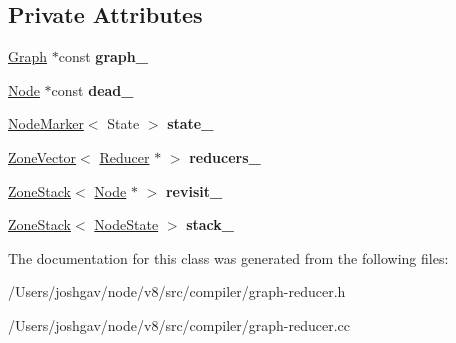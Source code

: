 \subsection*{Private Attributes}
\begin{DoxyCompactItemize}
\item 
\hyperlink{classv8_1_1internal_1_1compiler_1_1_graph}{Graph} $\ast$const {\bfseries graph\+\_\+}\hypertarget{classv8_1_1internal_1_1compiler_1_1_graph_reducer_ac9ecede3112133b13dd3836e921aeac7}{}\label{classv8_1_1internal_1_1compiler_1_1_graph_reducer_ac9ecede3112133b13dd3836e921aeac7}

\item 
\hyperlink{classv8_1_1internal_1_1compiler_1_1_node}{Node} $\ast$const {\bfseries dead\+\_\+}\hypertarget{classv8_1_1internal_1_1compiler_1_1_graph_reducer_adb5f30dc16f540d01186c7237545e3b9}{}\label{classv8_1_1internal_1_1compiler_1_1_graph_reducer_adb5f30dc16f540d01186c7237545e3b9}

\item 
\hyperlink{classv8_1_1internal_1_1compiler_1_1_node_marker}{Node\+Marker}$<$ State $>$ {\bfseries state\+\_\+}\hypertarget{classv8_1_1internal_1_1compiler_1_1_graph_reducer_a8a92d00b6c73dc841258d04214c852e3}{}\label{classv8_1_1internal_1_1compiler_1_1_graph_reducer_a8a92d00b6c73dc841258d04214c852e3}

\item 
\hyperlink{classv8_1_1internal_1_1_zone_vector}{Zone\+Vector}$<$ \hyperlink{classv8_1_1internal_1_1compiler_1_1_reducer}{Reducer} $\ast$ $>$ {\bfseries reducers\+\_\+}\hypertarget{classv8_1_1internal_1_1compiler_1_1_graph_reducer_abbe8e5ae035cdc4b1be9d53b89bebe17}{}\label{classv8_1_1internal_1_1compiler_1_1_graph_reducer_abbe8e5ae035cdc4b1be9d53b89bebe17}

\item 
\hyperlink{classv8_1_1internal_1_1_zone_stack}{Zone\+Stack}$<$ \hyperlink{classv8_1_1internal_1_1compiler_1_1_node}{Node} $\ast$ $>$ {\bfseries revisit\+\_\+}\hypertarget{classv8_1_1internal_1_1compiler_1_1_graph_reducer_ace0aa83c16614992cdaf59f4421352e5}{}\label{classv8_1_1internal_1_1compiler_1_1_graph_reducer_ace0aa83c16614992cdaf59f4421352e5}

\item 
\hyperlink{classv8_1_1internal_1_1_zone_stack}{Zone\+Stack}$<$ \hyperlink{structv8_1_1internal_1_1compiler_1_1_graph_reducer_1_1_node_state}{Node\+State} $>$ {\bfseries stack\+\_\+}\hypertarget{classv8_1_1internal_1_1compiler_1_1_graph_reducer_acf463c316efbde79030403c43d24a1f7}{}\label{classv8_1_1internal_1_1compiler_1_1_graph_reducer_acf463c316efbde79030403c43d24a1f7}

\end{DoxyCompactItemize}


The documentation for this class was generated from the following files\+:\begin{DoxyCompactItemize}
\item 
/\+Users/joshgav/node/v8/src/compiler/graph-\/reducer.\+h\item 
/\+Users/joshgav/node/v8/src/compiler/graph-\/reducer.\+cc\end{DoxyCompactItemize}
